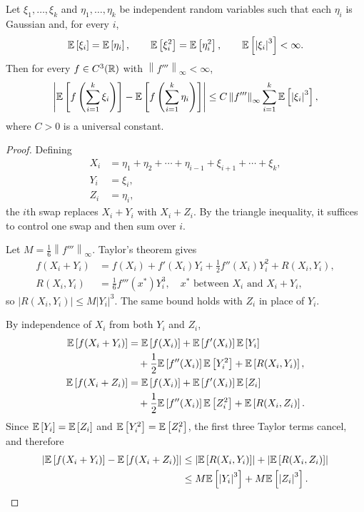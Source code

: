 \begin{lemma} \label{2-12-1}
	Let $\xi_1,\ldots,\xi_k$ and $\eta_1,\ldots,\eta_k$ be independent random variables such that each $\eta_i$ is Gaussian and, for every $i$,
	\[
		\mathbb{E}\left[\xi_i\right] = \mathbb{E}\left[\eta_i\right],
		\qquad
		\mathbb{E}\left[\xi_i^2\right] = \mathbb{E}\left[\eta_i^2\right],
		\qquad
		\mathbb{E}\left[\left| \xi_i \right|^3\right] < \infty.
	\]
	Then for every $f \in C^3(\mathbb{R})$ with $\left\|f'''\right\|_\infty < \infty$,
	\[
		\left| \mathbb{E}\left[f\left( \sum\limits_{i=1}^{k} \xi_i \right)\right] - \mathbb{E}\left[f\left( \sum\limits_{i=1}^{k} \eta_i \right)\right] \right|
		\le C \left\|f'''\right\|_\infty \sum\limits_{i=1}^{k} \mathbb{E}\left[\left| \xi_i \right|^3\right],
	\]
	where $C > 0$ is a universal constant.
\end{lemma}
\begin{proof}
	Defining
	\begin{align*}
		X_i &= \eta_1 + \eta_2 + \cdots + \eta_{i-1} + \xi_{i+1} + \cdots + \xi_{k}, \\
		Y_i &= \xi_i, \\
		Z_i &= \eta_i,
	\end{align*}
	the $i$th swap replaces $X_i + Y_i$ with $X_i + Z_i$. By the triangle inequality, it suffices to control one swap and then sum over $i$.

	Let $M = \frac{1}{6}\left\|f'''\right\|_\infty$. Taylor's theorem gives
	\begin{align*}
		f(X_i+Y_i) &= f(X_i) + f'(X_i)Y_i + \frac{1}{2} f''(X_i)Y_i^2 + R(X_i,Y_i), \\
		R(X_i,Y_i) &= \frac{1}{6} f'''(x^*) Y_i^3, \quad x^* \text{ between } X_i \text{ and } X_i+Y_i,
	\end{align*}
	so $\left| R(X_i,Y_i) \right| \le M \left| Y_i \right|^3$. The same bound holds with $Z_i$ in place of $Y_i$.

	By independence of $X_i$ from both $Y_i$ and $Z_i$,
	\begin{align*}
		\mathbb{E}\left[f(X_i+Y_i)\right]
		&= \mathbb{E}\left[f(X_i)\right] + \mathbb{E}\left[f'(X_i)\right] \mathbb{E}\left[Y_i\right] \\
		&\quad + \frac{1}{2}\mathbb{E}\left[f''(X_i)\right] \mathbb{E}\left[Y_i^2\right] + \mathbb{E}\left[R(X_i,Y_i)\right], \\
		\mathbb{E}\left[f(X_i+Z_i)\right]
		&= \mathbb{E}\left[f(X_i)\right] + \mathbb{E}\left[f'(X_i)\right] \mathbb{E}\left[Z_i\right] \\
		&\quad + \frac{1}{2}\mathbb{E}\left[f''(X_i)\right] \mathbb{E}\left[Z_i^2\right] + \mathbb{E}\left[R(X_i,Z_i)\right].
	\end{align*}
	Since $\mathbb{E}\left[Y_i\right] = \mathbb{E}\left[Z_i\right]$ and $\mathbb{E}\left[Y_i^2\right] = \mathbb{E}\left[Z_i^2\right]$, the first three Taylor terms cancel, and therefore
	\begin{align*}
		\left| \mathbb{E}\left[f(X_i + Y_i)\right] - \mathbb{E}\left[f(X_i + Z_i)\right] \right|
		&\le \left| \mathbb{E}\left[R(X_i,Y_i)\right] \right| + \left| \mathbb{E}\left[R(X_i,Z_i)\right] \right| \\
		&\le M \mathbb{E}\left[\left| Y_i \right|^3\right] + M \mathbb{E}\left[\left| Z_i \right|^3\right].
	\end{align*}


\end{proof}
